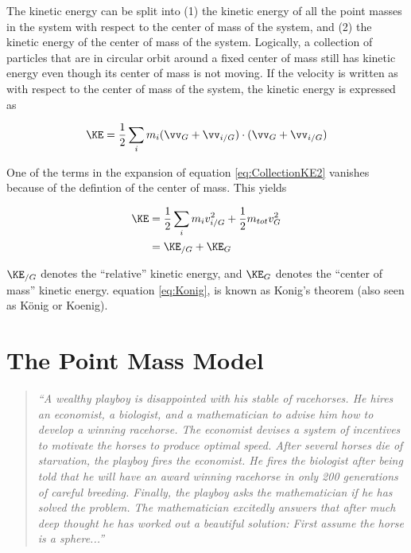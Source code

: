 The kinetic energy can be split into (1) the kinetic energy of all the point masses in the system with respect to the center of mass of the system, and (2) the kinetic energy of the center of mass of the system. Logically, a collection of particles that are in circular orbit around a fixed center of mass still has kinetic energy even though its center of mass is not moving. If the velocity is written as with respect to the center of mass of the system, the kinetic energy is expressed as

\begin{equation}
\KE = \frac{1}{2} \sum_{i} m_{i} (\vv_{G} + \vv_{i/G}) \cdot (\vv_{G} + \vv_{i/G})
\label{eq:CollectionKE2}
\end{equation}

One of the terms in the expansion of equation \ref{eq:CollectionKE2} vanishes because of the defintion of the center of mass. This yields

\begin{align}
\KE &= \frac{1}{2} \sum_{i} m_{i} v_{i/G}^2 + \frac{1}{2} m_{tot} v_{G}^2 \\
&= \KE_{/G} + \KE_{G}
\label{eq:Konig}
\end{align}

$\KE_{/G}$ denotes the ``relative'' kinetic energy, and $\KE_{G}$ denotes the ``center of mass'' kinetic energy. equation \ref{eq:Konig}, is known as Konig's theorem (also seen as K\"{o}nig or Koenig).

\section{The Point Mass Model} %
\label{sec:ThePointMassModel}

\begin{quote}

\emph{``A wealthy playboy is disappointed with his stable of racehorses. He hires an economist, a biologist, and a mathematician to advise him how to develop a winning racehorse. The economist devises a system of incentives to motivate the horses to produce optimal speed. After several horses die of starvation, the playboy fires the economist. He fires the biologist after being told that he will have an award winning racehorse in only 200 generations of careful breeding. Finally, the playboy asks the mathematician if he has solved the problem. The mathematician excitedly answers that after much deep thought he has worked out a beautiful solution: First assume the horse is a sphere...''}

\end{quote}

